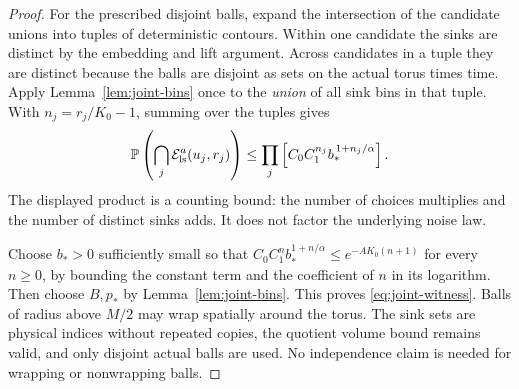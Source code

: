 \begin{proof}
For the prescribed disjoint balls, expand the intersection
of the candidate unions into tuples of deterministic
contours. Within one candidate the sinks are distinct by
the embedding and lift argument. Across candidates in a
tuple they are distinct because the balls are disjoint
as sets on the actual torus times time. Apply
Lemma~\ref{lem:joint-bins} once to the \emph{union} of all
sink bins in that tuple. With \(n_j=r_j/K_0-1\), summing
over the tuples gives
\begin{equation}\label{eq:tuple-charge}
 \mathbb P\left(\bigcap_j\mathcal E_{\rm ls}^a(u_j,r_j)\right)
 \le\prod_j\left[C_0C_1^{n_j}
                       b_*^{\,1+n_j/\alpha}\right].
\end{equation}
The displayed product is a counting bound: the number of
choices multiplies and the number of distinct sinks adds.
It does not factor the underlying noise law.

Choose \(b_*>0\) sufficiently small so that
\(C_0C_1^n b_*^{1+n/\alpha}\le
e^{-AK_0(n+1)}\) for every \(n\ge0\), by bounding the constant
term and the coefficient of \(n\) in its logarithm.
Then choose \(B,p_*\) by Lemma~\ref{lem:joint-bins}.
This proves \eqref{eq:joint-witness}.
Balls of radius above \(M/2\) may wrap spatially around
the torus. The sink sets are physical indices without
repeated copies, the quotient volume bound remains valid,
and only disjoint actual balls are used. No independence
claim is needed for wrapping or nonwrapping balls.
\end{proof}

